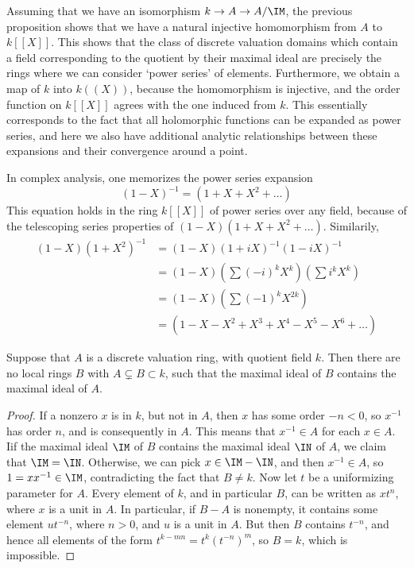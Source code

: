 Assuming that we have an isomorphism $k \to A \to A/\IM$, the previous proposition shows that we have a natural injective homomorphism from $A$ to $k[[X]]$. This shows that the class of discrete valuation domains which contain a field corresponding to the quotient by their maximal ideal are precisely the rings where we can consider `power series' of elements. Furthermore, we obtain a map of $k$ into $k((X))$, because the homomorphism is injective, and the order function on $k[[X]]$ agrees with the one induced from $k$. This essentially corresponds to the fact that all holomorphic functions can be expanded as power series, and here we also have additional analytic relationships between these expansions and their convergence around a point.

\begin{example}
    In complex analysis, one memorizes the power series expansion
    \[ (1-X)^{-1} = (1 + X + X^2 + \dots) \]
    This equation holds in the ring $k[[X]]$ of power series over any field, because of the telescoping series properties of $(1-X)(1 + X + X^2 + \dots)$. Similarily,
    \begin{align*}
        (1-X)(1 + X^2)^{-1} &= (1-X)(1 + iX)^{-1}(1 - iX)^{-1}\\
        &= (1-X) \left( \sum (-i)^k X^k \right) \left( \sum i^k X^k \right)\\
        &= (1-X) \left( \sum (-1)^k X^{2k} \right)\\
        &= (1 - X - X^2 + X^3 + X^4 - X^5 - X^6 + \dots)
    \end{align*}
\end{example}

\begin{prop}
    Suppose that $A$ is a discrete valuation ring, with quotient field $k$. Then there are no local rings $B$ with $A \subsetneq B \subset k$, such that the maximal ideal of $B$ contains the maximal ideal of $A$.
\end{prop}
\begin{proof}
    If a nonzero $x$ is in $k$, but not in $A$, then $x$ has some order $-n < 0$, so $x^{-1}$ has order $n$, and is consequently in $A$. This means that $x^{-1} \in A$ for each $x \in A$. Iif the maximal ideal $\IM$ of $B$ contains the maximal ideal $\IN$ of $A$, we claim that $\IM = \IN$. Otherwise, we can pick $x \in \IM - \IN$, and then $x^{-1} \in A$, so $1 = xx^{-1} \in \IM$, contradicting the fact that $B \neq k$. Now let $t$ be a uniformizing parameter for $A$. Every element of $k$, and in particular $B$, can be written as $xt^n$, where $x$ is a unit in $A$. In particular, if $B - A$ is nonempty, it contains some element $ut^{-n}$, where $n > 0$, and $u$ is a unit in $A$. But then $B$ contains $t^{-n}$, and hence all elements of the form $t^{k-mn} = t^k(t^{-n})^m$, so $B = k$, which is impossible.
\end{proof}

